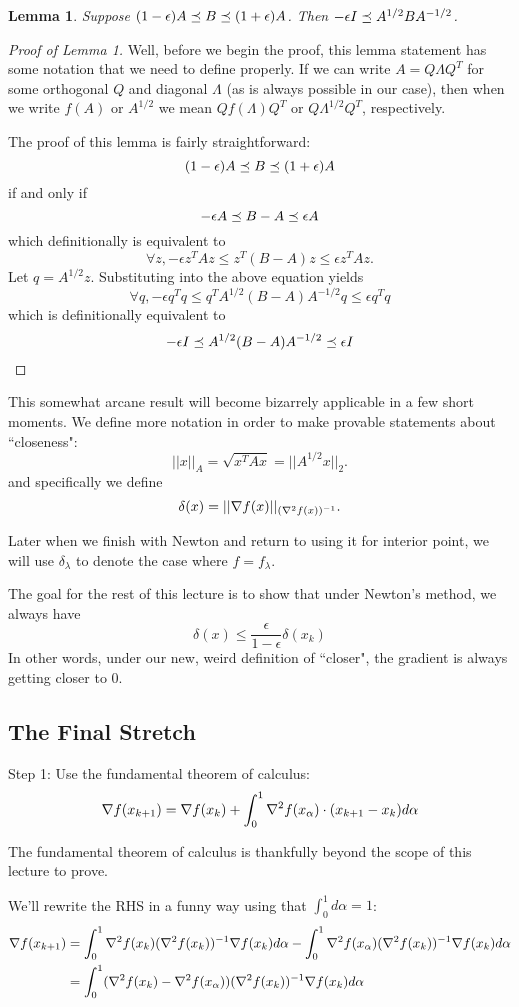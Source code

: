 \documentclass[11pt]{article}
\newtheorem{lemma}{Lemma}
\begin{document}
\begin{lemma}
	Suppose $(1-\epsilon) A \preceq B \preceq (1+\epsilon)A$. Then $-\epsilon I \preceq A^{1/2} B A^{-1/2}$.
\end{lemma}
\begin{proof}[Proof of Lemma 1]
	Well, before we begin the proof, this lemma statement has some notation that we need to define properly. If we can write $A = Q\Lambda Q^T$ for some orthogonal $Q$ and diagonal $\Lambda$ (as is always possible in our case), then when we write $f(A)$ or $A^{1/2}$ we mean $Q f(\Lambda) Q^T$ or $Q \Lambda^{1/2} Q^T$, respectively.
	
	The proof of this lemma is fairly straightforward:
	\[
	(1-\epsilon) A \preceq B  \preceq (1+\epsilon)A
	\]
	if and only if
	\[
	-\epsilon A\preceq B -A\preceq \epsilon A
	\]
	which definitionally is equivalent to
	\[
	\forall z, -\epsilon z^TAz \leq z^T(B-A)z \leq \epsilon z^T A z.
	\]
	Let $q = A^{1/2} z$. Substituting into the above equation yields
	\[
	\forall q, -\epsilon q^Tq \leq q^TA^{1/2}(B-A)A^{-1/2}q \leq \epsilon q^Tq
	\]
	which is definitionally equivalent to
	\[
	-\epsilon I \preceq A^{1/2}(B-A)A^{-1/2} \preceq \epsilon I
	\]
\end{proof}
This somewhat arcane result will become bizarrely applicable in a few short moments. We define more notation in order to make provable statements about ``closeness":
\[
||x||_A = \sqrt{x^TAx} = ||A^{1/2}x||_2.
\]
and specifically we define
\[
\delta(x) = ||\nabla f (x) ||_{(\nabla^2 f(x))^{-1}}.
\]

Later when we finish with Newton and return to using it for interior point, we will use $\delta_\lambda$ to denote the case where $f = f_\lambda$.

The goal for the rest of this lecture is to show that under Newton's method, we always have
\[
\delta(x) \leq \frac{\epsilon}{1-\epsilon} \delta(x_k)
\]
In other words, under our new, weird definition of ``closer", the gradient is always getting closer to 0.

\subsection{The Final Stretch}
Step 1: Use the fundamental theorem of calculus:
$$	\nabla f(x_{k+1}) = \nabla f(x_k) + \int_0^1 \nabla^2 f(x_\alpha) \cdot (x_{k+1} - x_k) d\alpha$$

The fundamental theorem of calculus is thankfully beyond the scope of this lecture to prove.

We'll rewrite the RHS in a funny way using that $\int_0^1 d\alpha = 1$:
\begin{align*}
\nabla f(x_{k+1}) &=\int_0^1 \nabla^2 f(x_k) (\nabla^2 f(x_k) )^{-1} \nabla f(x_k)d\alpha - \int_0^1\nabla^2 f(x_\alpha) (\nabla^2 f(x_k) )^{-1} \nabla f(x_k)d\alpha\\
{}&= \int_0^1 (\nabla^2 f(x_k) - \nabla^2 f(x_\alpha))(\nabla^2 f(x_k))^{-1}\nabla f(x_k) d\alpha
\end{align*}
\end{document}
